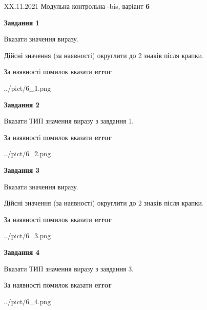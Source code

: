 \documentclass[11pt, ukrainian]{article}
\begin{document}
{XX.11.2021 Модульна контрольна -bis, варіант  \No \textbf { 6 }\par}
{
\begin {large}
{\begin {center}\textbf{Завдання 1}\end {center}}\par
Вказати значення виразу. \par
Дійсні значення (за наявності) округлити до 2 знаків після крапки. \par
За наявності помилок вказати \textbf{error}

\begin{center}
	{../pict/6_1.png}
\end{center}
\newpage

{\begin {center}\textbf{Завдання 2}\end {center}}\par
Вказати ТИП значення виразу з завдання 1. \par
За наявності помилок вказати \textbf{error}

\begin{center}
	{../pict/6_2.png}
\end{center}
\newpage

{\begin {center}\textbf{Завдання 3}\end {center}}\par
Вказати значення виразу. \par
Дійсні значення (за наявності) округлити до 2 знаків після крапки. \par
За наявності помилок вказати \textbf{error}

\begin{center}
	{../pict/6_3.png}
\end{center}
\newpage

{\begin {center}\textbf{Завдання 4}\end {center}}\par
Вказати ТИП значення виразу з завдання 3. \par
За наявності помилок вказати \textbf{error}

\begin{center}
	{../pict/6_4.png}
\end{center}
\newpage


\end{large}}
\end{document}
